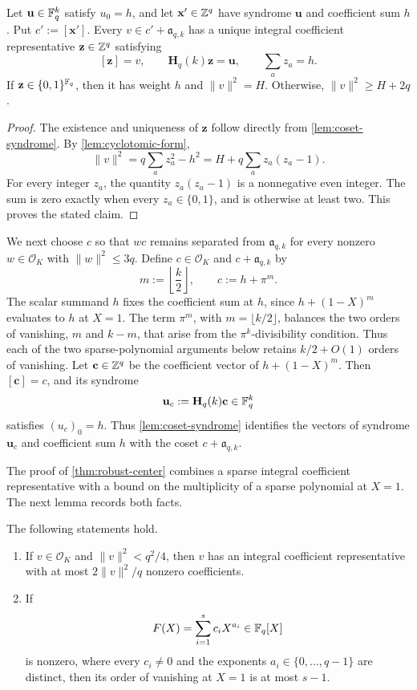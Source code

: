 \begin{lemma}
\label{lem:binary-shell}
Let $\mathbf u\in\mathbb F_q^k$ satisfy $u_0=h$, and let
$\mathbf x'\in\mathbb Z^q$ have syndrome $\mathbf u$ and coefficient sum $h$.
Put $c':=[\mathbf x']$.  Every $v\in c'+\mathfrak a_{q,k}$ has a unique
integral coefficient representative $\mathbf z\in\mathbb Z^q$ satisfying
\[
 [\mathbf z]=v,
 \qquad
 \mathbf H_q(k)\mathbf z=\mathbf u,
 \qquad
 \sum_a z_a=h.
\]
If $\mathbf z\in\{0,1\}^{\mathbb F_q}$, then it has weight $h$ and
$\|v\|^2=H$.  Otherwise, $\|v\|^2\ge H+2q$.
\end{lemma}

\begin{proof}
The existence and uniqueness of $\mathbf z$ follow directly from
\cref{lem:coset-syndrome}.  By \cref{lem:cyclotomic-form},
\[
 \|v\|^2=q\sum_a z_a^2-h^2
 =H+q\sum_a z_a(z_a-1).
\]
For every integer $z_a$, the quantity $z_a(z_a-1)$ is a nonnegative even
integer.  The sum is zero exactly when every $z_a\in\{0,1\}$, and is otherwise
at least two.  This proves the stated claim.
\end{proof}

We next choose $c$ so that $wc$ remains separated from
$\mathfrak a_{q,k}$ for every nonzero $w\in\mathcal{O}_K$ with
$\|w\|^2\le3q$.  Define $c\in\mathcal{O}_K$ and
$c+\mathfrak a_{q,k}$ by
\begin{equation}
\label{eq:robust-center}
 m:=\left\lfloor\frac k2\right\rfloor,
 \qquad
 c:=h+\pi^m.
\end{equation}
The scalar summand $h$ fixes the coefficient sum at $h$, since
$h+(1-X)^m$ evaluates to $h$ at $X=1$.  The term $\pi^m$, with
$m=\lfloor k/2\rfloor$, balances the two orders of vanishing, $m$ and $k-m$,
that arise from the $\pi^k$-divisibility condition.  Thus each of the two
sparse-polynomial arguments below retains $k/2+O(1)$ orders of vanishing.
Let $\mathbf c\in\mathbb Z^q$ be the coefficient vector of $h+(1-X)^m$.  Then
$[\mathbf c]=c$, and its syndrome
\[
 \mathbf u_c:=\mathbf H_q(k)\mathbf c\in\mathbb F_q^k
\]
satisfies $(u_c)_0=h$.  Thus \cref{lem:coset-syndrome} identifies the vectors
of syndrome $\mathbf u_c$ and coefficient sum $h$ with the coset
$c+\mathfrak a_{q,k}$.

The proof of \cref{thm:robust-center} combines a sparse integral
coefficient representative with a bound on the multiplicity of a sparse
polynomial at $X=1$.  The next lemma records both facts.
\begin{lemma}
\label{lem:sparse-tools}
The following statements hold.
\begin{enumerate}[label=(\roman*)]
 \item If $v\in\mathcal{O}_K$ and $\|v\|^2<q^2/4$, then $v$ has
 an integral coefficient representative with at most
 $2\|v\|^2/q$ nonzero coefficients.
 \item If
 \[
  F(X)=\sum_{i=1}^s c_iX^{a_i}\in\mathbb F_q[X]
 \]
 is nonzero, where every $c_i\ne0$ and the exponents
 $a_i\in\{0,\ldots,q-1\}$ are distinct, then its order of
 vanishing at
 $X=1$ is at most $s-1$.
\end{enumerate}
\end{lemma}

